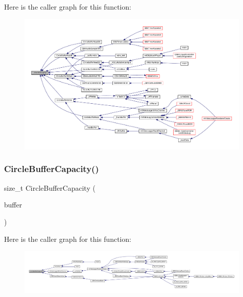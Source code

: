 Here is the caller graph for this function\+:
\nopagebreak
\begin{figure}[H]
\begin{center}
\leavevmode
\includegraphics[width=350pt]{circle-buffer_8c_a2916ab7c3aec1de4db02d13b1c6bf197_icgraph}
\end{center}
\end{figure}
\mbox{\label{circle-buffer_8c_a5ebad1136fc47aa3316b61c8efdd1ac4}} 
\subsubsection{\texorpdfstring{Circle\+Buffer\+Capacity()}{CircleBufferCapacity()}}
{\footnotesize\ttfamily size\+\_\+t Circle\+Buffer\+Capacity (\begin{DoxyParamCaption}\item[{const struct Circle\+Buffer $\ast$}]{buffer }\end{DoxyParamCaption})}

Here is the caller graph for this function\+:
\nopagebreak
\begin{figure}[H]
\begin{center}
\leavevmode
\includegraphics[width=350pt]{circle-buffer_8c_a5ebad1136fc47aa3316b61c8efdd1ac4_icgraph}
\end{center}
\end{figure}
\mbox{\label{circle-buffer_8c_a7f5170ef02fb49586dea9482e562c400}} 
